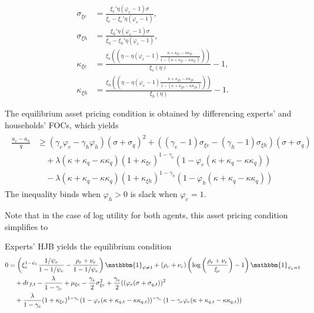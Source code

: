 \documentclass[12 pt, oneside]{article}
\theoremstyle{definition}
\theoremstyle{definition}
\theoremstyle{definition}
\begin{document}
\begin{align}
\label{eq:sigma xi e closed form}
  \sigma_{\xi e} & = \frac{\xi_e'\eta(\varphi_e - 1)\sigma}{\xi_e - \xi_e'\eta(\varphi_e - 1)},\\
\label{eq:sigma xi h closed form}
  \sigma_{\xi h} & = \frac{\xi_h'\eta(\varphi_e - 1)\sigma}{\xi_h - \xi_h'\eta(\varphi_e - 1)},\\
\label{eq:kappa xi e closed form}
  \kappa_{\xi e} & = \frac{\xi_e\left(\left(\eta - \eta(\varphi_e - 1)\frac{\kappa + \kappa_{\xi e} - \kappa\kappa_{\xi e}}{1 - (\kappa + \kappa_{\xi e} - \kappa\kappa_{\xi e})}\right)\right)}{\xi_e(\eta)} - 1,\\
\label{eq:kappa xi h closed form}
  \kappa_{\xi h} & = \frac{\xi_h\left(\left(\eta - \eta(\varphi_e - 1)\frac{\kappa + \kappa_{\xi h} - \kappa\kappa_{\xi h}}{1 - (\kappa + \kappa_{\xi h} - \kappa\kappa_{\xi h})}\right)\right)}{\xi_h(\eta)} - 1.
\end{align}


The equilibrium asset pricing condition is obtained by differencing experts' and households' FOCs, which yields
\begin{align}\label{eq:asset pricing cond}
\begin{split}
  \frac{a_e - a_h}{q} & \geq (\gamma_e\varphi_e - \gamma_h\varphi_h)(\sigma + \sigma_q)^2 + ((\gamma_e - 1) \sigma_{\xi e} - (\gamma_h - 1)\sigma_{\xi h})(\sigma + \sigma_q)\\
  &\quad + \lambda(\kappa + \kappa_q - \kappa\kappa_q)(1 + \kappa_{\xi e})^{ 1- \gamma_e}(1 - \varphi_e(\kappa + \kappa_q - \kappa\kappa_q))\\
  &\quad - \lambda(\kappa + \kappa_q - \kappa\kappa_q)(1 + \kappa_{\xi h})^{ 1- \gamma_h}(1 - \varphi_h(\kappa + \kappa_q - \kappa\kappa_q))
\end{split}
\end{align}
The inequality binds when $\varphi_h > 0$ is slack when $\varphi_e = 1$.

Note that in the case of log utility for both agents, this asset pricing condition simplifies to


Experts' HJB yields the equilibrium condition
\begin{align*}
0      & = \left(\xi_e^{1 - \psi_e}\frac{1 / \psi_e}{1 - 1/\psi_e}  - \frac{\rho_e + \nu_e}{1 - 1 / \psi_e} \right)\mathbbm{1}_{\psi\neq 1} + (\rho_e + \nu_e)\left(\log\left(\frac{\rho_e + \nu_e}{\xi_e}\right) - 1\right)\mathbbm{1}_{\psi_e = 1}\\
    &\quad + dr_{f, t} - \frac{\lambda}{1 - \gamma_e} + \mu_{\xi e} - \frac{\gamma_e}{2}\sigma_{\xi e}^2 +\frac{\gamma_e}{2}((\varphi_e(\sigma + \sigma_{q, t}))^2\\
    &\quad + \frac{\lambda}{1 - \gamma_e}(1 + \kappa_{\xi e})^{1 - \gamma_e}(1 - \varphi_e(\kappa + \kappa_{q, t} - \kappa \kappa_{q, t}))^{ - \gamma_e}\left(1 - \gamma_e\varphi_e(\kappa + \kappa_{q, t} - \kappa\kappa_{q, t})\right)
\end{align*}
\end{document}
